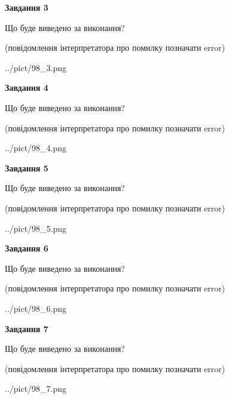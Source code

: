 \documentclass[12pt, ukrainian]{article}
\begin{document}
{\begin {large}
{\begin {center}\textbf{Завдання 3}\end {center}}\par
Що буде виведено за виконання?\par
 (повідомлення інтерпретатора про помилку позначати error)\par
\begin{center}
	{../pict/98_3.png}
\end{center}
\newpage

{\begin {center}\textbf{Завдання 4}\end {center}}\par
Що буде виведено за виконання?\par
 (повідомлення інтерпретатора про помилку позначати error)\par
\begin{center}
	{../pict/98_4.png}
\end{center}
\newpage

{\begin {center}\textbf{Завдання 5}\end {center}}\par
Що буде виведено за виконання?\par
 (повідомлення інтерпретатора про помилку позначати error)\par
\begin{center}
	{../pict/98_5.png}
\end{center}
\newpage

{\begin {center}\textbf{Завдання 6}\end {center}}\par
Що буде виведено за виконання?\par
 (повідомлення інтерпретатора про помилку позначати error)\par
\begin{center}
	{../pict/98_6.png}
\end{center}
\newpage

{\begin {center}\textbf{Завдання 7}\end {center}}\par
Що буде виведено за виконання?\par
 (повідомлення інтерпретатора про помилку позначати error)\par
\begin{center}
	{../pict/98_7.png}
\end{center}
\newpage


\end{large}}
\end{document}
